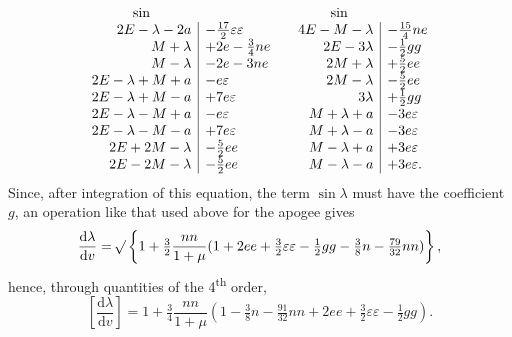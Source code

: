 \begingroup\small
\setlength{\arraycolsep}{3pt}\renewcommand{\arraystretch}{1.5}
\[
\begin{array}{r|l@{\qquad}r|l}
\multicolumn{1}{c}{\sin}& &\multicolumn{1}{c}{\sin}&\\
2E-\lambda-2a&-\tfrac{17}{2}\varepsilon\varepsilon
 &4E-M-\lambda&-\tfrac{15}{4}ne\\
M+\lambda&+2e-\tfrac34ne
 &2E-3\lambda&-\tfrac12gg\\
M-\lambda&-2e-3ne
 &2M+\lambda&+\tfrac52ee\\
2E-\lambda+M+a&-e\varepsilon
 &2M-\lambda&-\tfrac52ee\\
2E-\lambda+M-a&+7e\varepsilon
 &3\lambda&+\tfrac12gg\\
2E-\lambda-M+a&-e\varepsilon
 &M+\lambda+a&-3e\varepsilon\\
2E-\lambda-M-a&+7e\varepsilon
 &M+\lambda-a&-3e\varepsilon\\
2E+2M-\lambda&-\tfrac52ee
 &M-\lambda+a&+3e\varepsilon\\
2E-2M-\lambda&-\tfrac52ee
 &M-\lambda-a&+3e\varepsilon.
\end{array}
\]
\endgroup
\noindent Since, after integration of this equation, the term \(\sin\lambda\) must have the coefficient
\(g\), an operation like that used above for the
apogee gives
\[
\frac{\mathrm{d}\lambda}{\mathrm{d}v}
=\mathord{{}^{}\!\surd}\left\{1+\tfrac32\frac{nn}{1+\mu}
(1+2ee+\tfrac32\varepsilon\varepsilon-\tfrac12gg-\tfrac38n-\tfrac{79}{32}nn)\right\},
\]
\noindent hence, through quantities of the 4\textsuperscript{th} order,
\[
\left[\frac{\mathrm{d}\lambda}{\mathrm{d}v}\right]
=1+\tfrac34\frac{nn}{1+\mu}
(1-\tfrac38n-\tfrac{91}{32}nn+2ee+\tfrac32\varepsilon\varepsilon-\tfrac12gg).
\]
\clearpage
\endgroup
